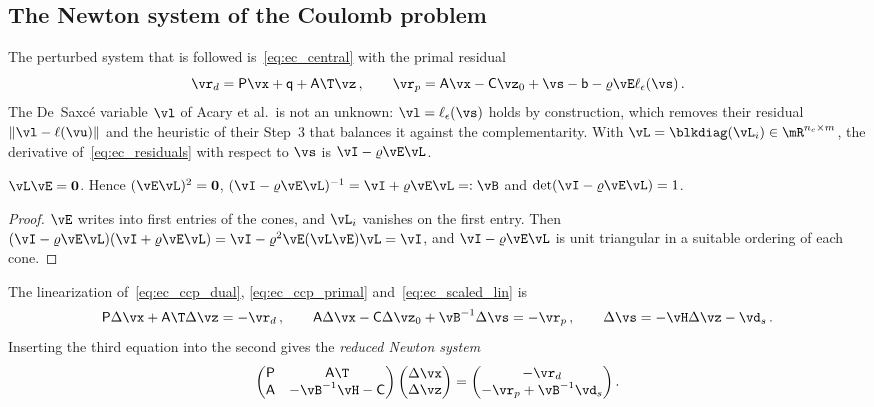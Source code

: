 \subsection{The Newton system of the Coulomb problem}\label{sec:ec_newton}
%
The perturbed system that is followed is~\eqref{eq:ec_central} with the primal residual
%
\begin{equation}\label{eq:ec_residuals}
	\vr_d = \mathsf{P}\vx + \mathsf{q} + \mathsf{A}\T\vz \, , \qquad
	\vr_p = \mathsf{A}\vx - \mathsf{C}\vz_0 + \vs - \mathsf{b} - \varrho\vE\ell_\epsilon(\vs) \, .
\end{equation}
%
The De~Saxc\'e variable $\vl$ of Acary et al.\ is not an unknown: $\vl = \ell_\epsilon(\vs)$ holds by construction, which removes their residual $\|\vl - \ell(\vu)\|$ and the heuristic of their Step~3 that balances it against the complementarity. With $\vL = \blkdiag(\vL_i) \in \mR^{n_c \times m}$, the derivative of~\eqref{eq:ec_residuals} with respect to $\vs$ is $\vI - \varrho\vE\vL$.
%
\begin{lemma}\label{lem:ec_nilpotent}
	$\vL\vE = \mathbf{0}$. Hence $(\vE\vL)^2 = \mathbf{0}$, $(\vI - \varrho\vE\vL)^{-1} = \vI + \varrho\vE\vL =: \vB$ and $\det(\vI - \varrho\vE\vL) = 1$.
\end{lemma}
%
\begin{proof}
	$\vE$ writes into first entries of the cones, and $\vL_i$ vanishes on the first entry. Then $(\vI - \varrho\vE\vL)(\vI + \varrho\vE\vL) = \vI - \varrho^2\vE(\vL\vE)\vL = \vI$, and $\vI - \varrho\vE\vL$ is unit triangular in a suitable ordering of each cone.
\end{proof}
%
The linearization of~\eqref{eq:ec_ccp_dual}, \eqref{eq:ec_ccp_primal} and~\eqref{eq:ec_scaled_lin} is
%
\begin{equation}\label{eq:ec_newton_full}
	\mathsf{P}\Delta\vx + \mathsf{A}\T\Delta\vz = -\vr_d \, , \qquad
	\mathsf{A}\Delta\vx - \mathsf{C}\Delta\vz_0 + \vB^{-1}\Delta\vs = -\vr_p \, , \qquad
	\Delta\vs = -\vH\Delta\vz - \vd_s \, .
\end{equation}
%
Inserting the third equation into the second gives the \emph{reduced Newton system}
%
\begin{equation}\label{eq:ec_newton}
	\begin{pmatrix} \mathsf{P} & \mathsf{A}\T \\ \mathsf{A} & -\vB^{-1}\vH - \mathsf{C} \end{pmatrix}
	\begin{pmatrix} \Delta\vx \\ \Delta\vz \end{pmatrix}
	= \begin{pmatrix} -\vr_d \\ -\vr_p + \vB^{-1}\vd_s \end{pmatrix} .
\end{equation}

